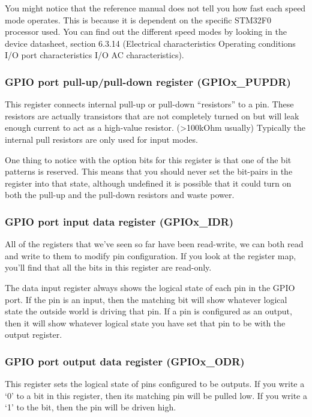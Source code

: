 \documentclass[11pt,fleqn]{book} %
\begin{document}
You might notice that the reference manual does not tell you how fast each speed mode operates. This is because it is dependent on the specific STM32F0 processor used. You can find out the different speed modes by looking in the device datasheet, section 6.3.14 (Electrical characteristics \textrightarrow Operating conditions \textrightarrow I/O port characteristics \textrightarrow I/O AC characteristics).

\subsubsection{GPIO port pull-up/pull-down register (GPIOx\_PUPDR)}
This register connects internal pull-up or pull-down ``resistors'' to a pin. These resistors are actually transistors that are not completely turned on but will leak enough current to act as a high-value resistor. (>100kOhm usually) Typically the internal pull resistors are only used for input modes.

One thing to notice with the option bits for this register is that one of the bit patterns is reserved. This means that you should never set the bit-pairs in the register into that state, although undefined it is possible that it could turn on both the pull-up and the pull-down resistors and waste power.

\subsubsection{GPIO port input data register (GPIOx\_IDR)}
All of the registers that we've seen so far have been read-write, we can both read and write to them to modify pin configuration. If you look at the register map, you'll find that all the bits in this register are read-only.

The data input register always shows the logical state of each pin in the GPIO port. If the pin is an input, then the matching bit will show whatever logical state the outside world is driving that pin. If a pin is configured as an output, then it will show whatever logical state you have set that pin to be with the output register.

\subsubsection{GPIO port output data register (GPIOx\_ODR)}
This register sets the logical state of pins configured to be outputs. If you write a `0' to a bit in this register, then its matching pin will be pulled low. If you write a `1' to the bit, then the pin will be driven high.
\end{document}
